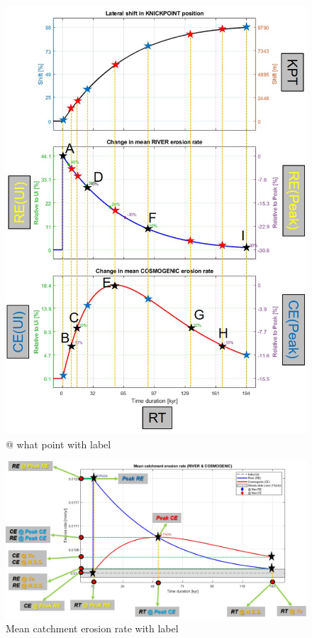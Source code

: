 \documentclass[11pt,a4paper,titlepage]{report}
\begin{document}
\begin{figure}[H]
    \centering
    \includegraphics[width=1\textwidth]{profilehelp2.jpg}
    \caption[@ what point with label]{@ what point with label}
    \label{fig:RECEhelp2}    
\end{figure}

\begin{figure}[H]
    \centering
    \includegraphics[width=1\textwidth]{profilehelp1.jpg}
    \caption[Mean catchment erosion rate with label]{Mean catchment erosion rate with label}
    \label{fig:RECEhelp1}    
\end{figure}
\end{document}

